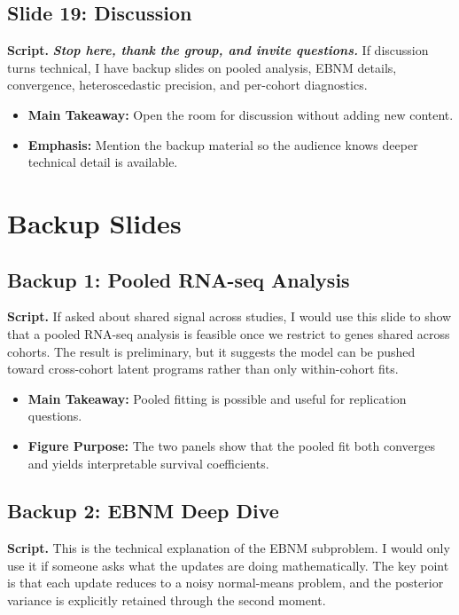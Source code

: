 \documentclass[11pt]{article}
\newcommand{\scriptlabel}{\textbf{Script. }}
\newcommand{\sectionlabel}[1]{\textbf{#1}}
\newcommand{\actioncue}[1]{\textit{\textbf{#1}}}
\begin{document}
\subsection*{Slide 19: Discussion}
\scriptlabel \actioncue{Stop here, thank the group, and invite questions.} If discussion turns technical, I have backup slides on pooled analysis, EBNM details, convergence, heteroscedastic precision, and per-cohort diagnostics.

\begin{itemize}
\item \sectionlabel{Main Takeaway:} Open the room for discussion without adding new content.
\item \sectionlabel{Emphasis:} Mention the backup material so the audience knows deeper technical detail is available.
\end{itemize}

\section*{Backup Slides}

\subsection*{Backup 1: Pooled RNA-seq Analysis}
\scriptlabel If asked about shared signal across studies, I would use this slide to show that a pooled RNA-seq analysis is feasible once we restrict to genes shared across cohorts. The result is preliminary, but it suggests the model can be pushed toward cross-cohort latent programs rather than only within-cohort fits.

\begin{itemize}
\item \sectionlabel{Main Takeaway:} Pooled fitting is possible and useful for replication questions.
\item \sectionlabel{Figure Purpose:} The two panels show that the pooled fit both converges and yields interpretable survival coefficients.
\end{itemize}

\subsection*{Backup 2: EBNM Deep Dive}
\scriptlabel This is the technical explanation of the EBNM subproblem. I would only use it if someone asks what the updates are doing mathematically. The key point is that each update reduces to a noisy normal-means problem, and the posterior variance is explicitly retained through the second moment.
\end{document}
